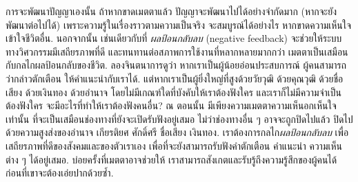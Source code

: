 {\begin{shaded}
		 
		การจะพัฒนาปัญญาเองนั้น ถ้าหากขาดเมตตาแล้ว ปัญญาจะพัฒนาไปได้อย่างจำกัดมาก (หากจะยังพัฒนาต่อไปได้)
		เพราะความรู้ในเรื่องราวตามความเป็นจริง จะสมบูรณ์ได้อย่างไร หากขาดความเห็นใจเข้าใจชีวิตอื่น.
		นอกจากนั้น 
เช่นเดียวกับที่ \textit{ผลป้อนกลับลบ} (negative feedback) จะช่วยให้ระบบทางวิศวกรรมมีเสถียรภาพที่ดี และทนทานต่อสภาพการใช้งานที่หลากหลายมากกว่า
เมตตาเป็นเสมือนกับกลไกผลป้อนกลับของชีวิต.
ลองจินตนาการดูว่า หากเราเป็นผู้น้อยอ่อนประสบการณ์ ผู้คนสามารถว่ากล่าวตักเตือน ให้คำแนะนำกับเราได้. 
แต่หากเราเป็นผู้ยิ่งใหญ่ที่สูงด้วยวัยวุฒิ ด้วยคุณวุฒิ ด้วยชื่อเสียง ด้วยเงินทอง ด้วยอำนาจ โดยไม่มีเกณฑ์ใดที่บังคับให้เราต้องฟังใคร และเราก็ไม่มีความจำเป็นต้องฟังใคร 
จะมีอะไรที่ทำให้เราต้องฟังคนอื่น? 
ณ ตอนนั้น มีเพียงความเมตตาความเห็นอกเห็นใจเท่านั้น ที่จะเป็นเสมือนช่องทางที่ยังจะเปิดรับฟังอยู่เสมอ ไม่ว่าช่องทางอื่น ๆ อาจจะถูกปิดไปแล้ว ปิดไปด้วยความสูงส่งของอำนาจ เกียรติยศ ศักดิ์ศรี ชื่อเสียง เงินทอง.
เราต้องการกลไก\textit{ผลป้อนกลับลบ} เพื่อเสถียรภาพที่ดีของสังคมและของตัวเราเอง
เพื่อที่จะยังสามารถรับฟังคำตักเตือน คำแนะนำ ความเห็นต่าง ๆ ได้อยู่เสมอ.
บ่อยครั้งที่เมตตาอาจช่วยให้ เราสามารถสังเกตและรับรู้ถึงความรู้สึกของผู้คนได้ ก่อนที่เขาจะต้องเอ่ยปากด้วยซ้ำ.

		\vspace{0.5cm}		
\begin{Parallel}[c]{0.45\textwidth}{0.4\textwidth}
\end{Parallel}
\vspace{0.5cm}
		

\end{shaded}}
